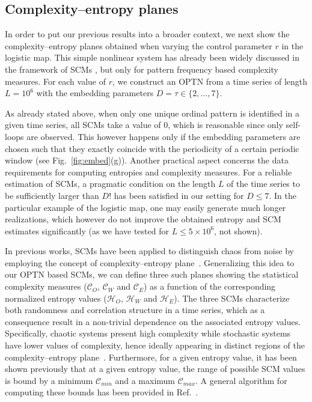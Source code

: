 \documentclass[12pt,aip,cha,reprint,nofootinbib]{revtex4-1}
\begin{document}
\subsection{Complexity--entropy planes} \label{sec:plane}

In order to put our previous results into a broader context, we next show the complexity--entropy planes obtained when varying the control parameter $r$ in the logistic map. This simple nonlinear system has already been widely discussed in the framework of SCMs \cite{RossoPRE2007,MartinPLA2003}, but only for pattern frequency based complexity measures. For each value of $r$, we construct an OPTN from a time series of length $L = 10 ^ 6$ with the embedding parameters $D = \tau \in \{2,\ldots,7\}$. 

As already stated above, when only one unique ordinal pattern is identified in a given time series, all SCMs take a value of $0$, which is reasonable since only self-loops are observed. This however happens only if the embedding parameters are chosen such that they exactly coincide with the periodicity of a certain periodic window (see Fig.~\ref{fig:embed}(g)). Another practical aspect concerns the data requirements for computing entropies and complexity measures. For a reliable estimation of SCMs, a pragmatic condition on the length $L$ of the time series to be sufficiently larger than $D!$ \cite{rossoPRL2007,kowalskiPhyD2007} has been satisfied in our setting for $D \leq 7$. In the particular example of the logistic map, one may easily generate much longer realizations, which however do not improve the obtained entropy and SCM estimates significantly (as we have tested for $L \leq 5 \times 10^6$, not shown). 

In previous works, SCMs have been applied to distinguish chaos from noise by employing the concept of complexity--entropy plane~\cite{rossoPRL2007}. Generalizing this idea to our OPTN based SCMs, we can define three such planes showing the statistical complexity measures ($\mathcal{C}_O$, $\mathcal{C}_W$ and $\mathcal{C}_E$) as a function of the corresponding normalized entropy values ($\mathcal{H}_O$, $\mathcal{H}_W$ and $\mathcal{H}_E$). The three SCMs characterize both randomness and correlation structure in a time series, which as a consequence result in a non-trivial dependence on the associated entropy values. Specifically, chaotic systems present high complexity while stochastic systems have lower values of complexity, hence ideally appearing in distinct regions of the complexity--entropy plane~\cite{rossoPRL2007}. Furthermore, for a given entropy value, it has been shown previously that at a given entropy value, the range of possible SCM values is bound by a minimum $\mathcal{C}_{min}$ and a maximum $\mathcal{C}_{max}$. A general algorithm for computing these bounds has been provided in Ref.~\cite{martinPhyA2006}. 
\end{document}
